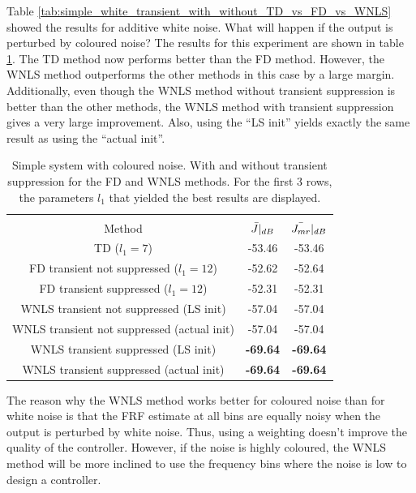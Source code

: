 Table \ref{tab:simple_white_transient_with_without_TD_vs_FD_vs_WNLS} showed the results for additive white noise. What will happen if the output is perturbed by coloured noise?  The results for this experiment are shown in table \ref{tab:simple_coloured_transient_with_without_TD_vs_FD_vs_WNLS}. The TD method now performs better than the FD method. However, the WNLS method outperforms the other methods in this case by a large margin. Additionally, even though the WNLS method without transient suppression is better than the other methods, the WNLS method with transient suppression gives a very large improvement. Also, using the ``LS init'' yields exactly the same result as using the ``actual init''.

\begin{table}[H]
\centering
\begin{tabular}{|ccc|}
\hline
&&\\[-2.5ex]
Method & $\Bar{J}|_{dB}$ & $\Bar{J_{mr}}|_{dB}$ \\
\hline
TD ($l_1 = 7$) & -53.46 & -53.46 \\
FD transient not suppressed ($l_1 = 12$) & -52.62 & -52.64 \\
FD transient suppressed ($l_1 = 12$) & -52.31 & -52.31 \\
WNLS transient not suppressed (LS init) & -57.04 & -57.04 \\
WNLS transient not suppressed (actual init) & -57.04 & -57.04 \\
WNLS transient suppressed (LS init) & \textbf{-69.64} & \textbf{-69.64} \\
WNLS transient suppressed (actual init) & \textbf{-69.64} & \textbf{-69.64} \\
\hline
\end{tabular}
\caption{Simple system with coloured noise. With and without transient suppression for the FD and WNLS methods. For the first 3 rows, the parameters $l_1$ that yielded the best results are displayed.}
\label{tab:simple_coloured_transient_with_without_TD_vs_FD_vs_WNLS}
\end{table}

\newpage
The reason why the WNLS method works better for coloured noise than for white noise is that the FRF estimate at all bins are equally noisy when the output is perturbed by white noise. Thus, using a weighting doesn't improve the quality of the controller. However, if the noise is highly coloured, the WNLS method will be more inclined to use the frequency bins where the noise is low to design a controller.

